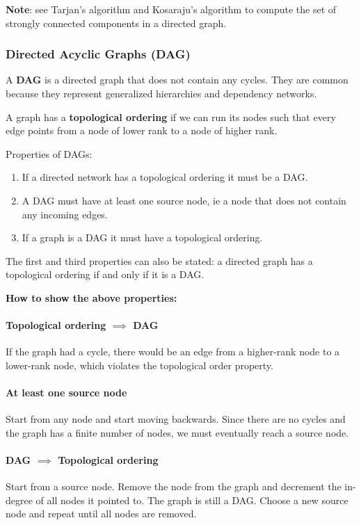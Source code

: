 \documentclass[11pt]{scrartcl} %
\begin{document}
\textbf{Note}: see Tarjan's algorithm and Kosaraju's algorithm to compute the set of strongly connected components in a directed graph.

\subsubsection{Directed Acyclic Graphs (DAG)}
A \textbf{DAG} is a directed graph that does not contain any cycles. They are common because they represent generalized hierarchies and dependency networks.

A graph has a \textbf{topological ordering} if we can run its nodes such that every edge points from a node of lower rank to a node of higher rank. 

Properties of DAGs:
\begin{enumerate}
	\item If a directed network has a topological ordering it must be a DAG.
	\item A DAG must have at least one source node, ie a node that does not contain any incoming edges.
	\item If a graph is a DAG it must have a topological ordering.
\end{enumerate}

The first and third properties can also be stated: a directed graph has a topological ordering if and only if it is a DAG.

\textbf{How to show the above properties:}
\paragraph{Topological ordering $\implies$ DAG} If the graph had a cycle, there would be an edge from a higher-rank node to a lower-rank node, which violates the topological order property.

\paragraph{At least one source node} Start from any node and start moving backwards. Since there are no cycles and the graph has a finite number of nodes, we must eventually reach a source node.

\paragraph{DAG $\implies$ Topological ordering} Start from a source node. Remove the node from the graph and decrement the in-degree of all nodes it pointed to. The graph is still a DAG. Choose a new source node and repeat until all nodes are removed.
\end{document}
